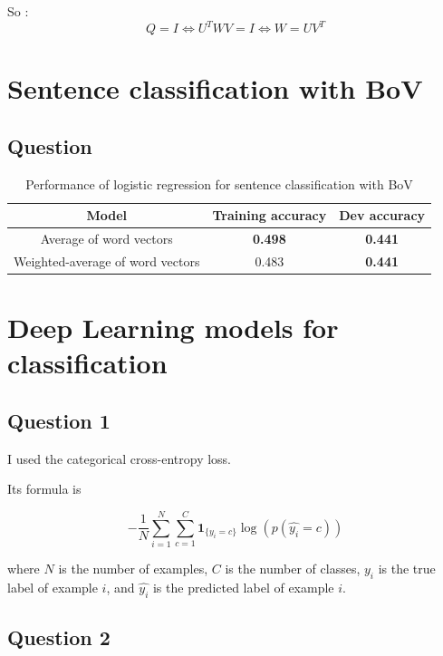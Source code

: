 \documentclass[11pt]{enpc-article}
\begin{document}
So :
$$
  Q = I \Leftrightarrow U^T W V = I \Leftrightarrow W = U V^T
$$

\section{Sentence classification with BoV}

\subsection*{Question}

\begin{table}[H]
  \centering
  \begin{tabular}{|c|c|c|}
  \hline
  \textbf{Model}                   & \textbf{Training accuracy} & \textbf{Dev accuracy} \\
  \hline
  Average of word vectors          & \textbf{0.498}             & \textbf{0.441} \\
  Weighted-average of word vectors & 0.483                      & \textbf{0.441} \\
  \hline
  \end{tabular}
  \caption{Performance of logistic regression for sentence classification with BoV}
\end{table}

\section{Deep Learning models for classification}

\subsection*{Question 1}

I used the categorical cross-entropy loss.

Its formula is

$$
  - \frac{1}{N} \sum_{i = 1}^N \sum_{c = 1}^C \mathbf{1}_{\{y_i = c \}} \log(p(\hat{y_i} = c))
$$

where $N$ is the number of examples, $C$ is the number of classes, $y_i$ is the true label of example $i$, and $\hat{y_i}$ is the predicted label of example $i$.

\subsection*{Question 2}
\end{document}
